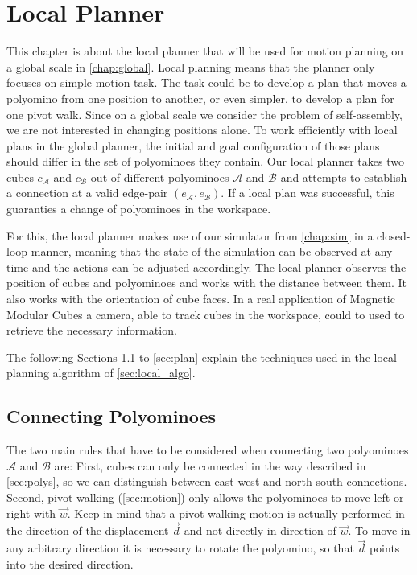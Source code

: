 \chapter{Local Planner}
\label{chap:local}

This chapter is about the local planner that will be used for motion planning on a global scale in \autoref{chap:global}.
Local planning means that the planner only focuses on simple motion task.
The task could be to develop a plan that moves a polyomino from one position to another, or even simpler, to develop a plan for one pivot walk.
Since on a global scale we consider the problem of self-assembly, we are not interested in changing positions alone.
To work efficiently with local plans in the global planner, the initial and goal configuration of those plans should differ in the set of polyominoes they contain.
Our local planner takes two cubes $c_\mathcal{A}$ and $c_\mathcal{B}$ out of different polyominoes $\mathcal{A}$ and $\mathcal{B}$ and attempts to establish a connection at a valid edge-pair $(e_\mathcal{A}, e_\mathcal{B})$.
If a local plan was successful, this guaranties a change of polyominoes in the workspace.

For this, the local planner makes use of our simulator from \autoref{chap:sim} in a closed-loop manner, meaning that the state of the simulation can be observed at any time and the actions can be adjusted accordingly.
The local planner observes the position of cubes and polyominoes and works with the distance between them.
It also works with the orientation of cube faces.
In a real application of Magnetic Modular Cubes a camera, able to track cubes in the workspace, could to used to retrieve the necessary information. 

The following Sections \ref{sec:connect} to \ref{sec:plan} explain the techniques used in the local planning algorithm of \autoref{sec:local_algo}.

\section{Connecting Polyominoes}
\label{sec:connect}

The two main rules that have to be considered when connecting two polyominoes $\mathcal{A}$ and $\mathcal{B}$ are:
First, cubes can only be connected in the way described in \autoref{sec:polys}, so we can distinguish between east-west and north-south connections.
Second, pivot walking (\autoref{sec:motion}) only allows the polyominoes to move left or right with $\vec{w}$.
Keep in mind that a pivot walking motion is actually performed in the direction of the displacement $\vec{d}$ and not directly in direction of $\vec{w}$.
To move in any arbitrary direction it is necessary to rotate the polyomino, so that $\vec{d}$ points into the desired direction.

